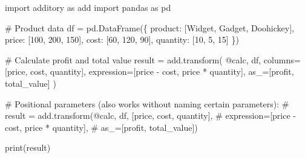 \documentclass[
  letterpaper,
]{scrbook}
\newenvironment{Shaded}{\begin{snugshade}}{\end{snugshade}}
\newcommand{\BuiltInTok}[1]{\textcolor[rgb]{0.00,0.23,0.31}{#1}}
\newcommand{\CommentTok}[1]{\textcolor[rgb]{0.37,0.37,0.37}{#1}}
\newcommand{\DecValTok}[1]{\textcolor[rgb]{0.68,0.00,0.00}{#1}}
\newcommand{\ImportTok}[1]{\textcolor[rgb]{0.00,0.46,0.62}{#1}}
\newcommand{\NormalTok}[1]{\textcolor[rgb]{0.00,0.23,0.31}{#1}}
\newcommand{\OperatorTok}[1]{\textcolor[rgb]{0.37,0.37,0.37}{#1}}
\newcommand{\StringTok}[1]{\textcolor[rgb]{0.13,0.47,0.30}{#1}}
\begin{document}
\begin{Shaded}
\begin{Highlighting}[]
\ImportTok{import}\NormalTok{ additory }\ImportTok{as}\NormalTok{ add}
\ImportTok{import}\NormalTok{ pandas }\ImportTok{as}\NormalTok{ pd}

\CommentTok{\# Product data}
\NormalTok{df }\OperatorTok{=}\NormalTok{ pd.DataFrame(\{}
    \StringTok{\textquotesingle{}product\textquotesingle{}}\NormalTok{: [}\StringTok{\textquotesingle{}Widget\textquotesingle{}}\NormalTok{, }\StringTok{\textquotesingle{}Gadget\textquotesingle{}}\NormalTok{, }\StringTok{\textquotesingle{}Doohickey\textquotesingle{}}\NormalTok{],}
    \StringTok{\textquotesingle{}price\textquotesingle{}}\NormalTok{: [}\DecValTok{100}\NormalTok{, }\DecValTok{200}\NormalTok{, }\DecValTok{150}\NormalTok{],}
    \StringTok{\textquotesingle{}cost\textquotesingle{}}\NormalTok{: [}\DecValTok{60}\NormalTok{, }\DecValTok{120}\NormalTok{, }\DecValTok{90}\NormalTok{],}
    \StringTok{\textquotesingle{}quantity\textquotesingle{}}\NormalTok{: [}\DecValTok{10}\NormalTok{, }\DecValTok{5}\NormalTok{, }\DecValTok{15}\NormalTok{]}
\NormalTok{\})}

\CommentTok{\# Calculate profit and total value}
\NormalTok{result }\OperatorTok{=}\NormalTok{ add.transform(}
    \StringTok{\textquotesingle{}@calc\textquotesingle{}}\NormalTok{,}
\NormalTok{    df,}
\NormalTok{    columns}\OperatorTok{=}\NormalTok{[}\StringTok{\textquotesingle{}price\textquotesingle{}}\NormalTok{, }\StringTok{\textquotesingle{}cost\textquotesingle{}}\NormalTok{, }\StringTok{\textquotesingle{}quantity\textquotesingle{}}\NormalTok{],}
\NormalTok{    expression}\OperatorTok{=}\NormalTok{[}\StringTok{\textquotesingle{}price {-} cost\textquotesingle{}}\NormalTok{, }\StringTok{\textquotesingle{}price * quantity\textquotesingle{}}\NormalTok{],}
\NormalTok{    as\_}\OperatorTok{=}\NormalTok{[}\StringTok{\textquotesingle{}profit\textquotesingle{}}\NormalTok{, }\StringTok{\textquotesingle{}total\_value\textquotesingle{}}\NormalTok{]}
\NormalTok{)}

\CommentTok{\# Positional parameters (also works without naming certain parameters):}
\CommentTok{\# result = add.transform(\textquotesingle{}@calc\textquotesingle{}, df, [\textquotesingle{}price\textquotesingle{}, \textquotesingle{}cost\textquotesingle{}, \textquotesingle{}quantity\textquotesingle{}], }
\CommentTok{\#                        expression=[\textquotesingle{}price {-} cost\textquotesingle{}, \textquotesingle{}price * quantity\textquotesingle{}], }
\CommentTok{\#                        as\_=[\textquotesingle{}profit\textquotesingle{}, \textquotesingle{}total\_value\textquotesingle{}])}

\BuiltInTok{print}\NormalTok{(result)}
\end{Highlighting}
\end{Shaded}
\end{document}
